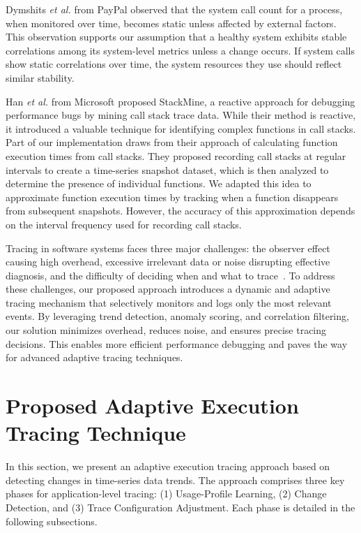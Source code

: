 \documentclass[pdflatex,sn-nature]{sn-jnl}%
\theoremstyle{thmstyleone}%
\theoremstyle{thmstyletwo}%
\theoremstyle{thmstylethree}%
\begin{document}
Dymshits \textit{et al.} \cite{dymshits2017process} from PayPal observed that the system call count for a process, when monitored over time, becomes static unless affected by external factors. This observation supports our assumption that a healthy system exhibits stable correlations among its system-level metrics unless a change occurs. If system calls show static correlations over time, the system resources they use should reflect similar stability.

Han \textit{et al.} \cite{han2012performance} from Microsoft proposed StackMine, a reactive approach for debugging performance bugs by mining call stack trace data. While their method is reactive, it introduced a valuable technique for identifying complex functions in call stacks. Part of our implementation draws from their approach of calculating function execution times from call stacks. They proposed recording call stacks at regular intervals to create a time-series snapshot dataset, which is then analyzed to determine the presence of individual functions. We adapted this idea to approximate function execution times by tracking when a function disappears from subsequent snapshots. However, the accuracy of this approximation depends on the interval frequency used for recording call stacks.

Tracing in software systems faces three major challenges: the observer effect causing high overhead, excessive irrelevant data or noise disrupting effective diagnosis, and the difficulty of deciding when and what to trace~\cite{parker-2020}. To address these challenges, our proposed approach introduces a dynamic and adaptive tracing mechanism that selectively monitors and logs only the most relevant events. By leveraging trend detection, anomaly scoring, and correlation filtering, our solution minimizes overhead, reduces noise, and ensures precise tracing decisions. This enables more efficient performance debugging and paves the way for advanced adaptive tracing techniques.



\section{Proposed Adaptive Execution Tracing Technique} \label{methodology}


In this section, we present an adaptive execution tracing approach based on detecting changes in time-series data trends. The approach comprises three key phases for application-level tracing: (1) Usage-Profile Learning, (2) Change Detection, and (3) Trace Configuration Adjustment. Each phase is detailed in the following subsections.
\end{document}
